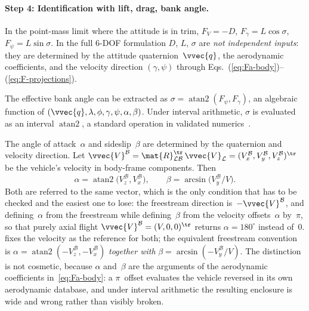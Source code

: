 \paragraph{Step 4: Identification with lift, drag, bank angle.}
In the point-mass limit where the attitude is in trim,
$F_V = -D$, $F_\gamma = L\cos\sigma$, $F_\psi = L\sin\sigma$.
In the full 6-DOF formulation $D$, $L$, $\sigma$ are \emph{not independent
inputs}: they are determined by the attitude quaternion~$\vvec{q}$, the
aerodynamic coefficients, and the velocity direction $(\gamma,\psi)$
through Eqs.~(\ref{eq:Fa-body})--(\ref{eq:F-projections}).

\begin{remark}\label{rem:bank-angle}
The effective bank angle can be extracted as
$\sigma = \operatorname{atan2}(F_\psi, F_\gamma)$,
an algebraic function of
$({\vvec{q}},\lambda,\phi,\gamma,\psi,\alpha,\beta)$. Under interval
arithmetic, $\sigma$ is evaluated as an interval $\operatorname{atan2}$, a
standard operation in validated numerics~\cite{moore2009introduction}.
\end{remark}

\begin{remark}\label{rem:aoa-sideslip}
The angle of attack~$\alpha$ and sideslip~$\beta$ are
determined by the quaternion and velocity direction. Let
$\vvec{V}^{\mathcal{B}} = \mat{R}_{\mathcal{L}\mathcal{B}}^{\tr}\,
\vvec{V}_{\mathcal{L}}
= (V_x^{\mathcal{B}},V_y^{\mathcal{B}},V_z^{\mathcal{B}})^\tr$ be the
vehicle's velocity in body-frame components. Then
\begin{equation}\label{eq:aoa-sideslip}
  \alpha = \operatorname{atan2}\bigl(V_z^{\mathcal{B}},
                                     V_x^{\mathcal{B}}\bigr),
  \qquad
  \beta  = \arcsin\bigl(V_y^{\mathcal{B}}/V\bigr).
\end{equation}
Both are referred to the same vector, which is the only condition that has
to be checked and the easiest one to lose: the freestream direction
is~$-\vvec{V}^{\mathcal{B}}$, and defining~$\alpha$ from the freestream
while defining~$\beta$ from the velocity offsets~$\alpha$ by~$\pi$, so that
purely axial flight $\vvec{V}^{\mathcal{B}} = (V,0,0)^\tr$ returns
$\alpha = 180^\circ$ instead of~$0$.  fixes the
velocity as the reference for both; the equivalent freestream convention is
$\alpha = \operatorname{atan2}(-V_z^{\mathcal{B}},-V_x^{\mathcal{B}})$
\emph{together with} $\beta = \arcsin(-V_y^{\mathcal{B}}/V)$. The
distinction is not cosmetic, because $\alpha$ and~$\beta$ are the arguments
of the aerodynamic coefficients in~\cref{eq:Fa-body}: a $\pi$~offset
evaluates the vehicle reversed in its own aerodynamic database, and under
interval arithmetic the resulting enclosure is wide and wrong rather than
visibly broken.
\end{remark}


